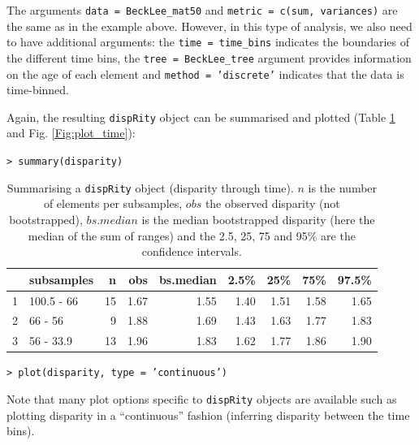 \documentclass[12pt,letterpaper]{article}
\newcommand{\disp}{\texttt{dispRity} }
\begin{document}
\noindent The arguments \texttt{data = BeckLee\_mat50} and \texttt{metric = c(sum, variances)} are the same as in the example above.
However, in this type of analysis, we also need to have additional arguments: the \texttt{time = time\_bins} indicates the boundaries of the different time bins, the \texttt{tree = BeckLee\_tree} argument provides information on the age of each element and \texttt{method = 'discrete'} indicates that the data is time-binned.

Again, the resulting \disp object can be summarised and plotted (Table \ref{Tab:summary_time} and Fig. \ref{Fig:plot_time}):

\noindent \texttt{> summary(disparity)}

\begin{table}[ht]
\centering
\begin{tabular}{rlrrrrrrr}
  \hline
 & subsamples & n & obs & bs.median & 2.5\% & 25\% & 75\% & 97.5\% \\ 
  \hline
1 & 100.5 - 66 &  15 & 1.67 & 1.55 & 1.40 & 1.51 & 1.58 & 1.65 \\ 
  2 & 66 - 56 &   9 & 1.88 & 1.69 & 1.43 & 1.63 & 1.77 & 1.83 \\ 
  3 & 56 - 33.9 &  13 & 1.96 & 1.83 & 1.62 & 1.77 & 1.86 & 1.90 \\ 
   \hline
\end{tabular}
\caption{Summarising a \disp object (disparity through time). $n$ is the number of elements per subsamples, $obs$ the observed disparity (not bootstrapped), $bs.median$ is the median bootstrapped disparity (here the median of the sum of ranges) and the 2.5, 25, 75 and 95\% are the confidence intervals.}
\label{Tab:summary_time}
\end{table}

\noindent \texttt{> plot(disparity, type = 'continuous')}

\noindent Note that many plot options specific to \disp objects are available such as plotting disparity in a ``continuous'' fashion (inferring disparity between the time bins).
\end{document}

